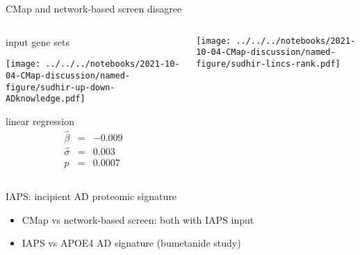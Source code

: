 \documentclass[aspectratio=169]{beamer}
\begin{document}
\begin{frame}{CMap and network-based screen disagree}
\begin{columns}[t]
\begin{column}{0.4\textwidth}
  input gene sets

  \texttt{[image: ../../../notebooks/2021-10-04-CMap-discussion/named-figure/sudhir-up-down-ADknowledge.pdf]}

  \vfill
  linear regression
  \begin{eqnarray*}
    \hat{\beta} &=& -0.009 \\
    \hat{\sigma} &=& 0.003 \\
    p &=& 0.0007
  \end{eqnarray*}
\end{column}

\begin{column}{0.4\textwidth}

  \texttt{[image: ../../../notebooks/2021-10-04-CMap-discussion/named-figure/sudhir-lincs-rank.pdf]}
\end{column}

\end{columns}
\end{frame}

\begin{frame}{IAPS: incipient AD proteomic signature}
  \begin{itemize}
    \item CMap vs network-based screen: both with IAPS input
    \item IAPS vs APOE4 AD signature (bumetanide study)
  \end{itemize}
\end{frame}
\end{document}
